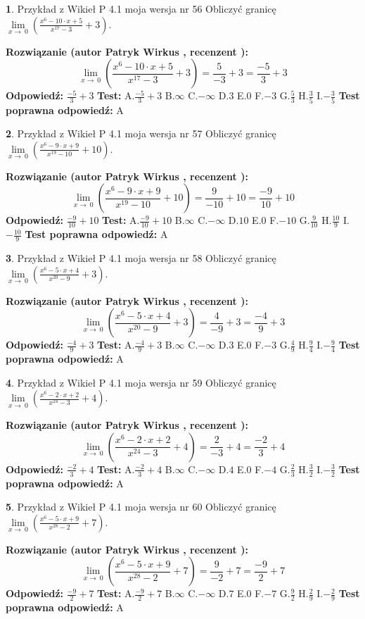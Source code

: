 \documentclass[12pt, a4paper]{article}
\theoremstyle{definition} %
\newtheorem{zad}{}
\newcommand{\zadStart}[1]{\begin{zad}#1\newline}
\newcommand{\zadStop}{\end{zad}}
\newcommand{\rozwStart}[2]{\noindent \textbf{Rozwiązanie (autor #1 , recenzent #2): }\newline}
\newcommand{\rozwStop}{\newline}
\newcommand{\odpStart}{\noindent \textbf{Odpowiedź:}\newline}
\newcommand{\odpStop}{\newline}
\newcommand{\testStart}{\noindent \textbf{Test:}\newline}
\newcommand{\testStop}{\newline}
\newcommand{\kluczStart}{\noindent \textbf{Test poprawna odpowiedź:}\newline}
\newcommand{\kluczStop}{\newline}
\begin{document}
\zadStart{Przykład z Wikieł P 4.1 moja wersja nr 56}
Obliczyć granicę $\lim\limits_{x\to\ 0}(\frac{x^{6}-10 \cdot x +5}{x^{17}-3}+3)$.
\zadStop
\rozwStart{Patryk Wirkus}{}
$$\lim\limits_{x\to\ 0}(\frac{x^{6}-10 \cdot x +5}{x^{17}-3}+3)=\frac{5}{-3}+3=\frac{-5}{3}+3$$
\rozwStop
\odpStart
$\frac{-5}{3}+3$
\odpStop
\testStart
A.$\frac{-5}{3}+3$
B.$\infty$
C.$-\infty$
D.$3$
E.$0$
F.$-3$
G.$\frac{5}{3}$
H.$\frac{3}{5}$
I.$-\frac{3}{5}$
\testStop
\kluczStart
A
\kluczStop



\zadStart{Przykład z Wikieł P 4.1 moja wersja nr 57}
Obliczyć granicę $\lim\limits_{x\to\ 0}(\frac{x^{6}-9 \cdot x +9}{x^{19}-10}+10)$.
\zadStop
\rozwStart{Patryk Wirkus}{}
$$\lim\limits_{x\to\ 0}(\frac{x^{6}-9 \cdot x +9}{x^{19}-10}+10)=\frac{9}{-10}+10=\frac{-9}{10}+10$$
\rozwStop
\odpStart
$\frac{-9}{10}+10$
\odpStop
\testStart
A.$\frac{-9}{10}+10$
B.$\infty$
C.$-\infty$
D.$10$
E.$0$
F.$-10$
G.$\frac{9}{10}$
H.$\frac{10}{9}$
I.$-\frac{10}{9}$
\testStop
\kluczStart
A
\kluczStop



\zadStart{Przykład z Wikieł P 4.1 moja wersja nr 58}
Obliczyć granicę $\lim\limits_{x\to\ 0}(\frac{x^{6}-5 \cdot x +4}{x^{20}-9}+3)$.
\zadStop
\rozwStart{Patryk Wirkus}{}
$$\lim\limits_{x\to\ 0}(\frac{x^{6}-5 \cdot x +4}{x^{20}-9}+3)=\frac{4}{-9}+3=\frac{-4}{9}+3$$
\rozwStop
\odpStart
$\frac{-4}{9}+3$
\odpStop
\testStart
A.$\frac{-4}{9}+3$
B.$\infty$
C.$-\infty$
D.$3$
E.$0$
F.$-3$
G.$\frac{4}{9}$
H.$\frac{9}{4}$
I.$-\frac{9}{4}$
\testStop
\kluczStart
A
\kluczStop



\zadStart{Przykład z Wikieł P 4.1 moja wersja nr 59}
Obliczyć granicę $\lim\limits_{x\to\ 0}(\frac{x^{6}-2 \cdot x +2}{x^{24}-3}+4)$.
\zadStop
\rozwStart{Patryk Wirkus}{}
$$\lim\limits_{x\to\ 0}(\frac{x^{6}-2 \cdot x +2}{x^{24}-3}+4)=\frac{2}{-3}+4=\frac{-2}{3}+4$$
\rozwStop
\odpStart
$\frac{-2}{3}+4$
\odpStop
\testStart
A.$\frac{-2}{3}+4$
B.$\infty$
C.$-\infty$
D.$4$
E.$0$
F.$-4$
G.$\frac{2}{3}$
H.$\frac{3}{2}$
I.$-\frac{3}{2}$
\testStop
\kluczStart
A
\kluczStop



\zadStart{Przykład z Wikieł P 4.1 moja wersja nr 60}
Obliczyć granicę $\lim\limits_{x\to\ 0}(\frac{x^{6}-5 \cdot x +9}{x^{28}-2}+7)$.
\zadStop
\rozwStart{Patryk Wirkus}{}
$$\lim\limits_{x\to\ 0}(\frac{x^{6}-5 \cdot x +9}{x^{28}-2}+7)=\frac{9}{-2}+7=\frac{-9}{2}+7$$
\rozwStop
\odpStart
$\frac{-9}{2}+7$
\odpStop
\testStart
A.$\frac{-9}{2}+7$
B.$\infty$
C.$-\infty$
D.$7$
E.$0$
F.$-7$
G.$\frac{9}{2}$
H.$\frac{2}{9}$
I.$-\frac{2}{9}$
\testStop
\kluczStart
A
\kluczStop
\end{document}
